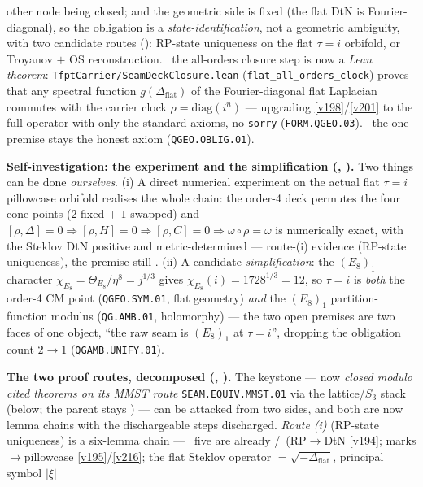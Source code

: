 \documentclass[11pt,a4paper]{article}
\begin{document}
\begin{keybox}
other node being closed; and the geometric side is fixed (the flat DtN is Fourier-diagonal), so the obligation is
a \emph{state-identification}, not a geometric ambiguity, with two candidate routes (\mC): RP-state uniqueness on
the flat $\tau{=}i$ orbifold, or Troyanov $+$ OS reconstruction. \mE\ the all-orders closure step is now a
\emph{Lean theorem}: \texttt{TfptCarrier/SeamDeckClosure.lean} (\texttt{flat\_all\_orders\_clock}) proves that any
spectral function $g(\Delta_{\mathrm{flat}})$ of the Fourier-diagonal flat Laplacian commutes with the carrier
clock $\rho=\mathrm{diag}(i^n)$ --- upgrading \vref{v198}/\vref{v201} to the full operator with only the standard
axioms, no \texttt{sorry} (\texttt{FORM.QGEO.03}). \mO\ the one premise stays the honest axiom
(\texttt{QGEO.OBLIG.01}).
\par\smallskip\noindent\textbf{Self-investigation: the experiment and the simplification
(, ).} Two things can be done
\emph{ourselves}. (i) A direct numerical experiment on the actual flat $\tau{=}i$ pillowcase orbifold realises
the whole chain: the order-4 deck permutes the four cone points ($2$ fixed $+$ $1$ swapped) and
$[\rho,\Delta]{=}0\Rightarrow[\rho,H]{=}0\Rightarrow[\rho,C]{=}0\Rightarrow\omega\circ\rho{=}\omega$ is
numerically exact, with the Steklov DtN positive and metric-determined --- route-(i) evidence (RP-state
uniqueness), the premise still \mO. (ii) A candidate \emph{simplification}: the $(E_8)_1$ character
$\chi_{E_8}=\Theta_{E_8}/\eta^8=j^{1/3}$ gives $\chi_{E_8}(i)=1728^{1/3}=12$, so $\tau{=}i$ is \emph{both} the
order-4 CM point (\texttt{QGEO.SYM.01}, flat geometry) \emph{and} the $(E_8)_1$ partition-function modulus
(\texttt{QG.AMB.01}, holomorphy) --- the two open premises are two faces of one object, ``the raw seam is
$(E_8)_1$ at $\tau{=}i$'', dropping the obligation count $2\to1$ (\texttt{QGAMB.UNIFY.01}).
\par\smallskip\noindent\textbf{The two proof routes, decomposed (,
).} The keystone --- now \emph{closed modulo cited theorems on its
MMST route} \texttt{SEAM.EQUIV.MMST.01} via the
lattice/$S_3$ stack (below; the parent stays \mO) --- can be attacked from two sides, and
both are now lemma chains with the dischargeable steps discharged. \emph{Route (i)} (RP-state uniqueness) is a
six-lemma chain --- \mE\ five are already \mE/\mO\ (RP$\to$DtN \vref{v194}; marks$\to$pillowcase
\vref{v195}/\vref{v216}; the flat Steklov operator $=\sqrt{-\Delta_{\mathrm{flat}}}$, principal symbol $|\xi|$

\end{keybox}
\end{document}
